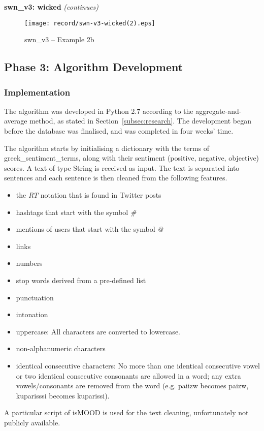 \clearpage

\textbf{swn\_v3: wicked} \textit{(continues)} \\

\begin{figure}[ht]
\centering
\texttt{[image: record/swn-v3-wicked(2).eps]}
\caption{swn\_v3 -- Example 2b}
\label{fig:swn-wicked2}
\end{figure}

\clearpage

\subsection{Phase 3: Algorithm Development}
\label{subsec:algorithm}

\subsubsection{Implementation}
\label{subsubsec:algimplementation}

The algorithm was developed in Python 2.7
according to the aggregate-and-average method,
as stated in Section~\ref{subsec:research}.
The development began before the database was finalised,
and was completed in four weeks' time.

The algorithm starts by initialising a dictionary
with the terms of greek\_sentiment\_terms,
along with their sentiment (positive, negative, objective) scores.
A text of type String is received as input.
The text is separated into sentences
and each sentence is then cleaned from the following features.

\begin{itemize}
 \item the \emph{RT} notation that is found in Twitter posts
 \item hashtags that start with the symbol \emph{\#}
 \item mentions of users that start with the symbol \emph{@}
 \item links
 \item numbers
 \item stop words derived from a pre-defined list
 \item punctuation
 \item intonation
 \item uppercase: All characters are converted to lowercase.
 \item non-alphanumeric characters
 \item identical consecutive characters:
 No more than one identical consecutive vowel
 or two identical consecutive consonants are allowed in a word;
 any extra vowels/consonants are removed from the word
 (e.g. \textgreek{paiizw} becomes \textgreek{paizw},
 \textgreek{kuparisssi} becomes \textgreek{kuparissi}).
\end{itemize}
A particular script of isMOOD is used for the text cleaning,
unfortunately not publicly available.

